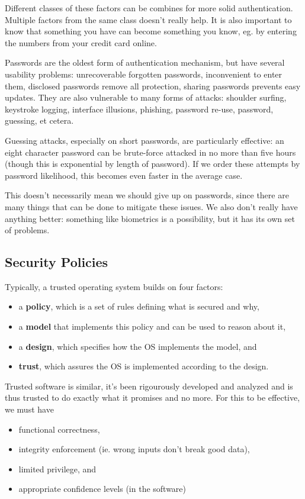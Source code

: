 \documentclass[12pt]{article}
\begin{document}
Different classes of these factors can be combines for more solid authentication. Multiple factors from the same class doesn't really help. It is also important to know that something you have can become something you know, eg. by entering the numbers from your credit card online.

Passwords are the oldest form of authentication mechanism, but have several usability problems: unrecoverable forgotten passwords, inconvenient to enter them, disclosed passwords remove all protection, sharing passwords prevents easy updates. They are also vulnerable to many forms of attacks: shoulder surfing, keystroke logging, interface illusions, phishing, password re-use, password, guessing, et cetera.

Guessing attacks, especially on short passwords, are particularly effective: an eight character password can be brute-force attacked in no more than five hours (though this is exponential by length of password). If we order these attempts by password likelihood, this becomes even faster in the average case.

This doesn't necessarily mean we should give up on passwords, since there are many things that can be done to mitigate these issues. We also don't really have anything better: something like biometrics is a possibility, but it has its own set of problems.

\subsection{Security Policies}
Typically, a trusted operating system builds on four factors:
\begin{itemize}
\item a {\bf policy}, which is a set of rules defining what is secured and why,
\item a {\bf model} that implements this policy and can be used to reason about it,
\item a {\bf design}, which specifies how the OS implements the model, and
\item {\bf trust}, which assures the OS is implemented according to the design.
\end{itemize}

Trusted software is similar, it's been rigourously developed and analyzed and is thus trusted to do exactly what it promises and no more. For this to be effective, we must have
\begin{itemize}
\item functional correctness,
\item integrity enforcement (ie. wrong inputs don't break good data),
\item limited privilege, and
\item appropriate confidence levels (in the software)
\end{itemize}
\end{document}
